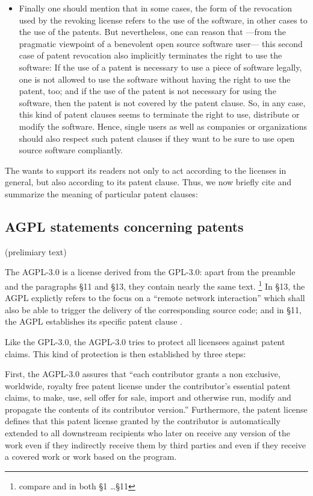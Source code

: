 \begin{itemize}
  \item Finally one should mention that in some cases, the form of the
  revocation used by the revoking license refers to the use of the software, in
  other cases to the use of the patents. But nevertheless, one can reason that%
  ---from the pragmatic viewpoint of a benevolent open source software user---%
  this second case of patent revocation also implicitly terminates the right to
  use the software: If the use of a patent is necessary to use a piece of
  software legally, one is not allowed to use the software without having the
  right to use the patent, too; and if the use of the patent is not necessary
  for using the software, then the patent is not covered by the patent clause.
  So, in any case, this kind of patent clauses seems to terminate the right to
  use, distribute or modify the software. Hence, single users as well
  as companies or organizations should also respect such patent clauses if they
  want to be sure to use open source software compliantly.
\end{itemize}

The \oslic{} wants to support its readers not only to act according to the licenses
in general, but also according to its patent clause. Thus, we now briefly cite
and summarize the meaning of particular patent clauses:

\subsection{AGPL statements concerning patents}

(prelimiary text)

The AGPL-3.0 is a license derived from the GPL-3.0: apart from the preamble and
the paragraphs §11 and §13, they contain nearly the same text.%
  \footnote{compare \cite[][\nopage]{Agpl30OsiLicense2007a} and
  \cite[][\nopage]{Gpl30OsiLicense2007a} in both §1 \ldots §11}
In §13, the AGPL explictly refers to the focus on a \enquote{remote network
interaction} which shall also be able to trigger the delivery of the
corresponding source code; and in §11, the AGPL establishes its specific patent
clause \cite[cf.][\nopage §11 and §13]{Agpl30OsiLicense2007a}.

Like the GPL-3.0, the AGPL-3.0 tries to protect all licensees against patent
claims. This kind of protection is then established by three steps:

First, the AGPL-3.0 assures that \enquote{each contributor grants a non
exclusive, worldwide, royalty free patent license under the contributor’s
essential patent claims, to make, use, sell offer for sale, import and
otherwise run, modify and propagate the contents of its contributor
version.} Furthermore, the patent license defines that this patent
license granted by the contributor is automatically extended to all downstream
recipients who later on receive any version of the work even if they indirectly
receive them by third parties and even if they receive a covered work or work
based on the program.

